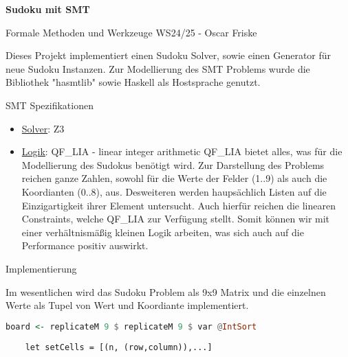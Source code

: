 

\usepackage{listings}



\begin{Large}
    \textsf{\textbf{Sudoku mit SMT}}

    Formale Methoden und Werkzeuge WS24/25 - Oscar Friske
\end{Large}
\vspace{2ex}

Dieses Projekt implementiert einen Sudoku Solver, sowie einen Generator für neue Sudoku Instanzen. Zur Modellierung des SMT Problems wurde die Bibliothek "hasmtlib" sowie Haskell als Hostsprache genutzt.

\vspace{2ex}

\begin{Large}
    SMT Spezifikationen
\end{Large}
\begin{itemize}
  \item \underline{Solver}: Z3
  \item \underline{Logik}: QF\_LIA - linear integer arithmetic \newline
        QF\_LIA bietet alles, was für die Modellierung des Sudokus benötigt wird. Zur Darstellung des Problems reichen ganze Zahlen, sowohl für die Werte der Felder (1..9) als auch die Koordianten (0..8), aus. Desweiteren werden haupsächlich Listen auf die Einzigartigkeit ihrer Element untersucht. Auch hierfür reichen die linearen Constraints, welche QF\_LIA zur Verfügung stellt. Somit können wir mit einer verhältnismäßig kleinen Logik arbeiten, was sich auch auf die Performance positiv auswirkt.
\end{itemize}
\vspace{2ex}

\begin{Large}
    Implementierung
\end{Large}
\vspace{2ex}

Im wesentlichen wird das Sudoku Problem als 9x9 Matrix und die einzelnen Werte als Tupel von Wert und Koordiante implementiert.
\begin{lstlisting}[language=Haskell]
    board <- replicateM 9 $ replicateM 9 $ var @IntSort
\end{lstlisting}
\begin{lstlisting}
    let setCells = [(n, (row,column)),...]
\end{lstlisting}

